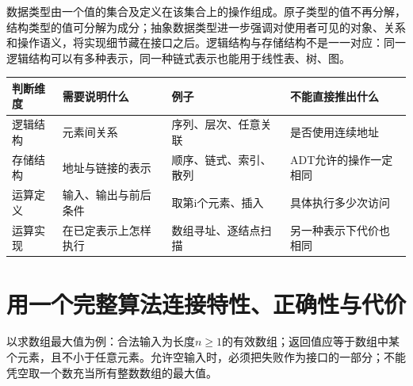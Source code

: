 数据类型由一个值的集合及定义在该集合上的操作组成。原子类型的值不再分解，结构类型的值可分解为成分；抽象数据类型进一步强调对使用者可见的对象、关系和操作语义，将实现细节藏在接口之后。逻辑结构与存储结构不是一一对应：同一逻辑结构可以有多种表示，同一种链式表示也能用于线性表、树、图。

\begin{wideblock}

\par\medskip\noindent\begin{minipage}{\linewidth}\fontsize{9.3}{12}\selectfont\begin{tabularx}{\linewidth}{@{}YYYY@{}}
\toprule\noalign{}
\begin{minipage}[b]{\linewidth}\raggedright
判断维度
\end{minipage} & \begin{minipage}[b]{\linewidth}\raggedright
需要说明什么
\end{minipage} & \begin{minipage}[b]{\linewidth}\raggedright
例子
\end{minipage} & \begin{minipage}[b]{\linewidth}\raggedright
不能直接推出什么
\end{minipage} \\
\midrule\noalign{}


逻辑结构 & 元素间关系 & 序列、层次、任意关联 & 是否使用连续地址 \\
存储结构 & 地址与链接的表示 & 顺序、链式、索引、散列 & ADT允许的操作一定相同 \\
运算定义 & 输入、输出与前后条件 & 取第i个元素、插入 & 具体执行多少次访问 \\
运算实现 & 在已定表示上怎样执行 & 数组寻址、逐结点扫描 & 另一种表示下代价也相同 \\
\bottomrule\end{tabularx}
\end{minipage}\par\medskip

\end{wideblock}

\section{用一个完整算法连接特性、正确性与代价}\label{DS01-code}

\begin{methodbox}

以求数组最大值为例：合法输入为长度\(n\ge1\)的有效数组；返回值应等于数组中某个元素，且不小于任意元素。允许空输入时，必须把失败作为接口的一部分；不能凭空取一个数充当所有整数数组的最大值。

\end{methodbox}

